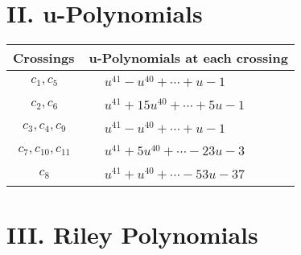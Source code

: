 \documentclass[1p]{elsarticle_modified}
\theoremstyle{definition}
\begin{document}
\centering \section*{ II. u-Polynomials}
\begin{tabular}{m{50pt}|m{274pt}}
Crossings & \hspace{64pt}u-Polynomials at each crossing \\
\hline $$\begin{aligned}c_{1},c_{5}\end{aligned}$$&$\begin{aligned}
&u^{41}- u^{40}+\cdots+u-1
\end{aligned}$\\
\hline $$\begin{aligned}c_{2},c_{6}\end{aligned}$$&$\begin{aligned}
&u^{41}+15 u^{40}+\cdots+5 u-1
\end{aligned}$\\
\hline $$\begin{aligned}c_{3},c_{4},c_{9}\end{aligned}$$&$\begin{aligned}
&u^{41}- u^{40}+\cdots+u-1
\end{aligned}$\\
\hline $$\begin{aligned}c_{7},c_{10},c_{11}\end{aligned}$$&$\begin{aligned}
&u^{41}+5 u^{40}+\cdots-23 u-3
\end{aligned}$\\
\hline $$\begin{aligned}c_{8}\end{aligned}$$&$\begin{aligned}
&u^{41}+u^{40}+\cdots-53 u-37
\end{aligned}$\\
\hline
\end{tabular}\newpage\renewcommand{\arraystretch}{1}
\centering \section*{ III. Riley Polynomials}
\end{document}

